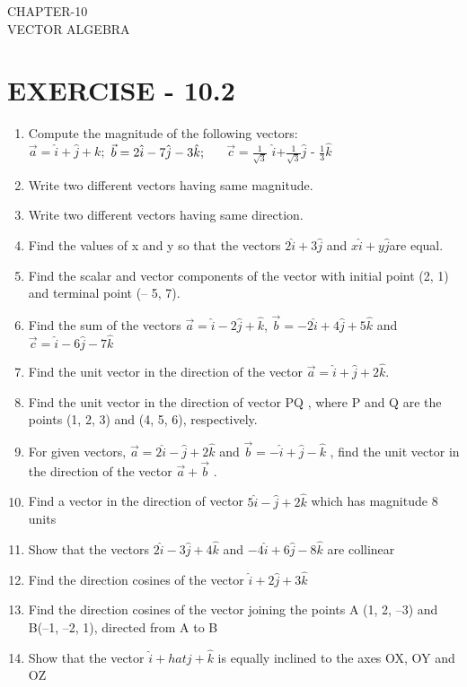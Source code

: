 \documentclass[12pt]{article}
\begin{document}
\begin{center}
\textbf\large{CHAPTER-10 \\ VECTOR ALGEBRA}
\end{center}
\section{EXERCISE - 10.2}
\begin{enumerate}
\item Compute the magnitude of the following vectors:\\
$\vec{a}=\hat{i}+\hat{j}+k;$ \hspace{0.5cm}  $\vec{b}=2\hat{i}-7\hat{j}-3\hat{k};\hspace{0.5cm}$  $\vec{c}=\frac{1}{\sqrt{3}}$ $\hat {i}$+$\frac{1}{\sqrt{3}}\hat{j}$ - $\frac{1}{3}\hat{k}$
\item Write two different vectors having same magnitude.
\item Write two different vectors having same direction.
\item Find the values of x and y so that the vectors $2\hat{i}+3\hat{j}$ and $x\hat{i}+y\hat{j}$are equal.
\item Find the scalar and vector components of the vector with initial point (2, 1) and
terminal point (– 5, 7).
\item Find the sum of the vectors $\vec{a}=\hat{i}-2\hat{j}+\hat{k}$, $\vec{b}=-2\hat{i}+4\hat{j}+5\hat{k}$ and $\vec{c}=\hat{i}-6\hat{j}-7\hat{k}$
\item Find the unit vector in the direction of the vector $\vec{a}=\hat{i}+\hat{j}+2\hat{k}$.
\item Find the unit vector in the direction of vector PQ , where P and Q are the points
(1, 2, 3) and (4, 5, 6), respectively.
\item For given vectors, $\vec{a}=2\hat{i}-\hat{j}+2\hat{k}$ and $\vec{b}=-\hat{i}+\hat{j}-\hat{k}$ , find the unit vector in the
direction of the vector $\vec{a}+\vec{b}$
.
\item Find a vector in the direction of vector $5\hat{i}-\hat{j}+2\hat{k}$ which has magnitude 8 units
\item Show that the vectors $2\hat{i}-3\hat{j}+4\hat{k}$ and $-4\hat{i}+6\hat{j}-8\hat{k}$ are collinear
\item Find the direction cosines of the vector $\hat{i}+2\hat{j}+3\hat{k}$
\item Find the direction cosines of the vector joining the points A (1, 2, –3) and
B(–1, –2, 1), directed from A to B
\item Show that the vector $\hat{i}+hat{j}+\hat{k}$ is equally inclined to the axes OX, OY and OZ

\end{enumerate}
\end{document}
